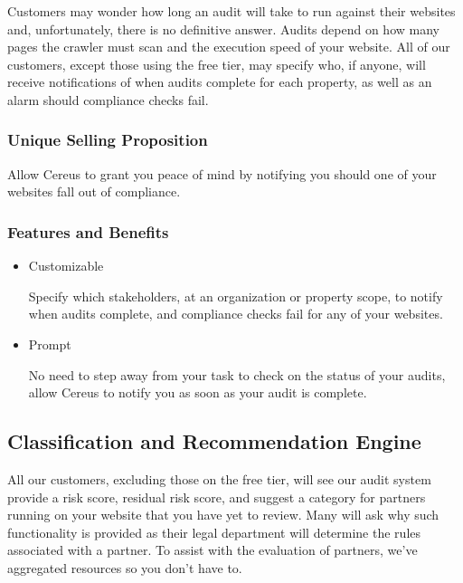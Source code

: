 Customers may wonder how long an audit will take to run against their websites and, unfortunately, there is no definitive answer. Audits depend on how many pages the crawler must scan and the execution speed of your website. All of our customers, except those using the free tier, may specify who, if anyone, will receive notifications of when audits complete for each property, as well as an alarm should compliance checks fail.

\subsubsection*{Unique Selling Proposition}

Allow Cereus to grant you peace of mind by notifying you should one of your websites fall out of compliance.

\subsubsection*{Features and Benefits}

\begin{itemize}

\item Customizable

  Specify which stakeholders, at an organization or property scope, to notify when audits complete, and compliance checks fail for any of your websites.

\item Prompt

  No need to step away from your task to check on the status of your audits, allow Cereus to notify you as soon as your audit is complete.

\end{itemize}


\subsection{Classification and Recommendation Engine}

All our customers, excluding those on the free tier, will see our audit system provide a risk score, residual risk score, and suggest a category for partners running on your website that you have yet to review. Many will ask why such functionality is provided as their legal department will determine the rules associated with a partner. To assist with the evaluation of partners, we've aggregated resources so you don't have to.

